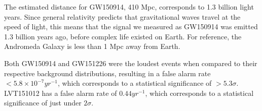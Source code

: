 The estimated distance for 
GW150914, 410 Mpc, corresponds to 1.3 billion light years. Since general 
relativity predicts that gravitational waves travel at the speed of light, 
this means that the signal we measured as GW150914 was emitted 1.3 billion 
years ago, before complex life existed on Earth. For reference, 
the Andromeda Galaxy is less than 1 Mpc away from Earth. 

Both GW150914 and GW151226 were the loudest events when compared to their 
respective background distributions, resulting in a false alarm rate 
$< 5.8\times10^{-7} yr^{-1}$, which corresponds to a statistical significance of 
$> 5.3\sigma$. LVT151012 has a false alarm rate of $0.44 yr^{-1}$, which 
corresponds to a statistical significance of just under $2\sigma$.

